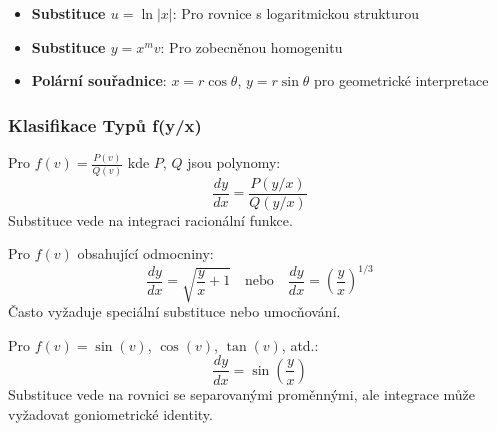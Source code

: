 \vspace{0.6\baselineskip}

\begin{method}
\label{met:alternativni-substituce}
\begin{itemize}
\item \textbf{Substituce $u = \ln|x|$}: Pro rovnice s logaritmickou strukturou

\item \textbf{Substituce $y = x^m v$}: Pro zobecněnou homogenitu

\item \textbf{Polární souřadnice}: $x = r\cos\theta$, $y = r\sin\theta$ pro geometrické interpretace
\end{itemize}
\end{method}

\vspace{0.8\baselineskip}

\subsubsection{Klasifikace Typů f(y/x)}
\label{subsubsec:klasifikace-funkci}

\begin{remark}
Pro $f(v) = \frac{P(v)}{Q(v)}$ kde $P$, $Q$ jsou polynomy:
\[
\frac{dy}{dx} = \frac{P(y/x)}{Q(y/x)}
\]
Substituce vede na integraci racionální funkce.
\end{remark}

\vspace{0.6\baselineskip}

\begin{remark}
Pro $f(v)$ obsahující odmocniny:
\[
\frac{dy}{dx} = \sqrt{\frac{y}{x} + 1} \quad \text{nebo} \quad \frac{dy}{dx} = \left(\frac{y}{x}\right)^{1/3}
\]
Často vyžaduje speciální substituce nebo umocňování.
\end{remark}

\vspace{0.6\baselineskip}

\begin{remark}
Pro $f(v) = \sin(v)$, $\cos(v)$, $\tan(v)$, atd.:
\[
\frac{dy}{dx} = \sin\left(\frac{y}{x}\right)
\]
Substituce vede na rovnici se separovanými proměnnými, ale integrace může vyžadovat goniometrické identity.
\end{remark}

\vspace{0.8\baselineskip}


